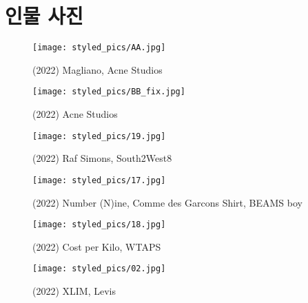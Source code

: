 \section*{인물 사진}
\begin{minipage}[h!]{0.5\textwidth}
    \begin{figure}[H]
        \texttt{[image: styled\_pics/AA.jpg]}
        \caption*{(2022) Magliano, Acne Studios}
    \end{figure}
\end{minipage}
\begin{minipage}[h!]{0.5\textwidth}
    \begin{figure}[H]
        \texttt{[image: styled\_pics/BB\_fix.jpg]}
        \caption*{(2022) Acne Studios}
    \end{figure}
\end{minipage}
\begin{minipage}[h!]{0.5\textwidth}
    \begin{figure}[H]
        \texttt{[image: styled\_pics/19.jpg]}
        \caption*{(2022) Raf Simons, South2West8}
    \end{figure}
\end{minipage}
\begin{minipage}[h!]{0.5\textwidth}
    \begin{figure}[H]
        \texttt{[image: styled\_pics/17.jpg]}
        \caption*{(2022) Number (N)ine, Comme des Garcons Shirt, BEAMS boy}
    \end{figure}
\end{minipage}
\begin{minipage}[h!]{0.5\textwidth}
    \begin{figure}[H]
        \texttt{[image: styled\_pics/18.jpg]}
        \caption*{(2022) Cost per Kilo, WTAPS}
    \end{figure}
\end{minipage}
\begin{minipage}[h!]{0.5\textwidth}
    \begin{figure}[H]
        \texttt{[image: styled\_pics/02.jpg]}
        \caption*{(2022) XLIM, Levis}
    \end{figure}
\end{minipage}
